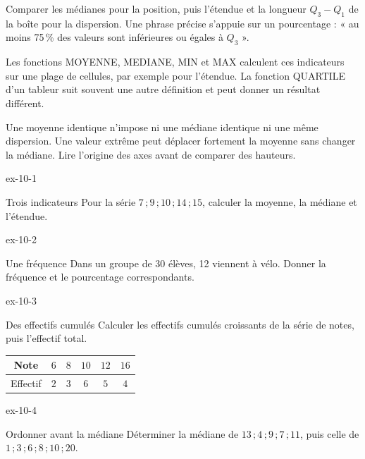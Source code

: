 \begin{savoirfaire}Comparer les médianes pour la position, puis l’étendue et la longueur $Q_3-Q_1$ de la boîte pour la dispersion. Une phrase précise s’appuie sur un pourcentage : « au moins 75\,\% des valeurs sont inférieures ou égales à $Q_3$ ».\end{savoirfaire}
\begin{savoirfaire}[Tableur]Les fonctions MOYENNE, MEDIANE, MIN et MAX calculent ces indicateurs sur une plage de cellules, par exemple  pour l’étendue. La fonction QUARTILE d’un tableur suit souvent une autre définition et peut donner un résultat différent.\end{savoirfaire}
\begin{attention}Une moyenne identique n’impose ni une médiane identique ni une même dispersion. Une valeur extrême peut déplacer fortement la moyenne sans changer la médiane. Lire l’origine des axes avant de comparer des hauteurs.\end{attention}
\clearpage{}
\begin{blocLivre}{ex-10-1}\begin{exercice}[1]{Trois indicateurs}
Pour la série $7\,;9\,;10\,;14\,;15$, calculer la moyenne, la médiane et l’étendue.
\end{exercice}\end{blocLivre}
\begin{blocLivre}{ex-10-2}\begin{exercice}[1]{Une fréquence}
Dans un groupe de 30 élèves, 12 viennent à vélo. Donner la fréquence et le pourcentage correspondants.
\end{exercice}\end{blocLivre}
\begin{blocLivre}{ex-10-3}\begin{exercice}[1]{Des effectifs cumulés}
Calculer les effectifs cumulés croissants de la série de notes, puis l’effectif total.\begin{center}\renewcommand{\arraystretch}{1.35}\begin{tabular}{c|ccccc}\toprule
Note & $6$ & $8$ & $10$ & $12$ & $16$\\\midrule
Effectif & $2$ & $3$ & $6$ & $5$ & $4$\\
\bottomrule\end{tabular}\end{center}
\end{exercice}\end{blocLivre}
\begin{blocLivre}{ex-10-4}\begin{exercice}[1]{Ordonner avant la médiane}
Déterminer la médiane de $13\,;4\,;9\,;7\,;11$, puis celle de $1\,;3\,;6\,;8\,;10\,;20$.
\end{exercice}\end{blocLivre}
